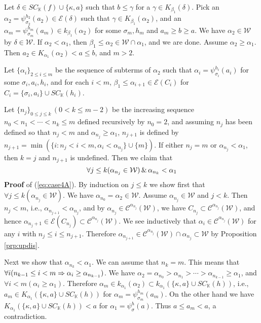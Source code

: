 \documentclass{article}
\newcommand{\mK}{\mathbb{K}}
\begin{document}
Let $\delta\in SC_{\mK}(f)\cup\{\kappa,a\}$ such that $b\leq \gamma$
for a $\gamma\in K_{\beta_{1}}(\delta)$.
Pick an $\alpha_{2}=\psi_{\sigma_{2}}^{h_{2}}(a_{2})\in \mathcal{E}(\delta)$ 
such that $\gamma\in K_{\beta_{1}}(\alpha_{2})$, and 
an $\alpha_{m}=\psi_{\sigma_{m}}^{h_{m}}(a_{m})\in k_{\beta_{1}}(\alpha_{2})$ for some $\sigma_{m},h_{m}$ and
$a_{m}\geq b\geq a$.
We have $\alpha_{2}\in\mathcal{W}$ by $\delta\in\mathcal{W}$.
If $\alpha_{2}<\alpha_{1}$, then
$\beta_{1}\leq\alpha_{2}\in\mathcal{W}\cap\alpha_{1}$, and we are done.
Assume $\alpha_{2}\geq\alpha_{1}$.
Then $a_{2}\in K_{\alpha_{1}}(\alpha_{2})<a\leq b$, and $m>2$.

Let $\{\alpha_{i}\}_{2\leq i\leq m}$ be the sequence of subterms of $\alpha_{2}$ such that
$\alpha_{i}=\psi_{\sigma_{i}}^{h_{i}}(a_{i})$ for some $\sigma_{i},a_{i},h_{i}$,
and for each $i<m$,
$\beta_{1}\leq\alpha_{i+1}\in\mathcal{E}(C_{i})$ for $C_{i}=\{\sigma_{i},a_{i}\}\cup SC_{\mK}(h_{i})$.

Let $\{n_{j}\}_{0\leq j\leq k}\, (0<k\leq m-2)$ be the increasing sequence $n_{0}<n_{1}<\cdots<n_{k}\leq m$ 
defined recursively by $n_{0}=2$, and assuming $n_{j}$ has been defined so that
$n_{j}<m$ and $\alpha_{n_{j}}\geq\alpha_{1}$, $n_{j+1}$ is defined by
$n_{j+1}=\min(\{i: n_{j}< i<m, \alpha_{i}<\alpha_{n_{j}}\}\cup\{m\})$.
If either $n_{j}=m$ or $\alpha_{n_{j}}<\alpha_{1}$, then $k=j$ and $n_{j+1}$ is undefined.
Then we claim that
\begin{equation}\label{eq:case4A}
\forall j\leq k(\alpha_{n_{j}}\in\mathcal{W}) \,\&\, \alpha_{n_{k}}<\alpha_{1}
\end{equation}
\textbf{Proof} of (\ref{eq:case4A}).
By induction on $j\leq k$ we show first that $\forall j\leq k(\alpha_{n_{j}}\in\mathcal{W})$. 
We have $\alpha_{n_{0}}=\alpha_{2}\in\mathcal{W}$.
Assume $\alpha_{n_{j}}\in\mathcal{W}$ and $j<k$.
Then $n_{j}<m$, i.e., $\alpha_{n_{j+1}}<\alpha_{n_{j}}$, and 
by $\alpha_{n_{j}}\in\mathcal{C}^{\alpha_{n_{j}}}(\mathcal{W})$, we have $C_{n_{j}}\subset\mathcal{C}^{\alpha_{n_{j}}}(\mathcal{W})$,
and hence $\alpha_{n_{j}+1}\in\mathcal{E}(C_{n_{j}})\subset\mathcal{C}^{\alpha_{n_{j}}}(\mathcal{W})$.
We see inductively that
$\alpha_{i}\in \mathcal{C}^{\alpha_{n_{j}}}(\mathcal{W})$ for any $i$ with $n_{j}\leq i\leq n_{j+1}$.
Therefore $\alpha_{n_{j+1}}\in \mathcal{C}^{\alpha_{n_{j}}}(\mathcal{W})\cap\alpha_{n_{j}}\subset\mathcal{W}$ by Proposition \ref{prp:updis}.

Next we show that $\alpha_{n_{k}}<\alpha_{1}$.
We can assume that $n_{k}=m$.
This means that $\forall i(n_{k-1}\leq i<m \Rightarrow \alpha_{i}\geq\alpha_{n_{k-1}})$.
We have
$\alpha_{2}=\alpha_{n_{0}}>\alpha_{n_{1}}>\cdots>\alpha_{n_{k-1}}\geq\alpha_{1}$, and
$\forall i<m(\alpha_{i}\geq\alpha_{1})$.
Therefore $\alpha_{m}\in k_{\alpha_{1}}(\alpha_{2})\subset k_{\alpha_{1}}(\{\kappa,a\}\cup SC_{\mK}(h))$, i.e.,
$a_{m}\in K_{\alpha_{1}}(\{\kappa,a\}\cup SC_{\mK}(h))$ for $\alpha_{m}=\psi_{\sigma_{m}}^{h_{m}}(a_{m})$.
On the other hand we have $K_{\alpha_{1}}(\{\kappa,a\}\cup SC_{\mK}(h))<a$ for 
$\alpha_{1}=\psi_{\sigma}^{h}(a)$.
Thus $a\leq a_{m}<a$, a contradiction.
\end{document}
